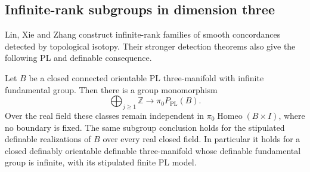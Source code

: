 \subsection{Infinite-rank subgroups in dimension three}

Lin, Xie and Zhang construct infinite-rank families of smooth
concordances detected by topological isotopy.  Their stronger detection
theorems also give the following PL and definable consequence.

\begin{theorem}\label{thm:infinite-rank-three-components}
Let $B$ be a closed connected orientable PL three-manifold with
infinite fundamental group.  Then there is a group monomorphism
\[
             \bigoplus_{j\geq1}\mathbb Z
                   \longrightarrow\pi_0P_{\mathrm{PL}}(B).
\]
Over the real field these classes remain independent in
$\pi_0\operatorname{Homeo}(B\times I)$, where no boundary is fixed.
The same subgroup conclusion holds for the stipulated definable
realizations of $B$ over every real closed field.  In particular it
holds for a closed definably orientable definable three-manifold
whose definable fundamental group is infinite, with its stipulated
finite PL model.
\end{theorem}

